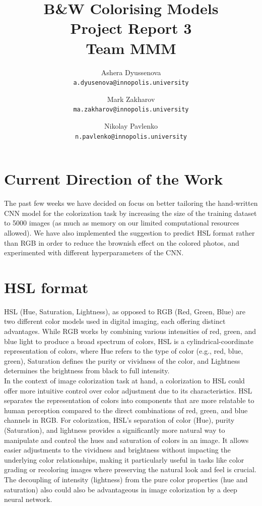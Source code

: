 \documentclass[]{article}
\title{B\&W Colorising Models\\Project Report 3\\Team MMM}
\author{
	Ashera Dyussenova\\
	\texttt{a.dyusenova@innopolis.university}
	\and
	Mark Zakharov\\
	\texttt{ma.zakharov@innopolis.university}
	\and
	Nikolay Pavlenko\\
	\texttt{n.pavlenko@innopolis.university}
}
\begin{document}
	\maketitle
	\section{Current Direction of the Work}
	The past few weeks we have decided on focus on better tailoring the hand-written CNN model for the colorization task by increasing the size of the training dataset to 5000 images (as much as memory on our limited computational resources allowed). We have also implemented the suggestion to predict HSL format rather than RGB in order to reduce the brownish effect on the colored photos, and experimented with different hyperparameters of the CNN.
	\\
	\section{HSL format}
	HSL (Hue, Saturation, Lightness), as opposed to RGB (Red, Green, Blue) are two different color models used in digital imaging, each offering distinct advantages. While RGB works by combining various intensities of red, green, and blue light to produce a broad spectrum of colors, HSL is a cylindrical-coordinate representation of colors, where Hue refers to the type of color (e.g., red, blue, green), Saturation defines the purity or vividness of the color, and Lightness determines the brightness from black to full intensity. \\
	
	In the context of image colorization task at hand, a colorization to HSL could offer more intuitive control over color adjustment due to its characteristics. HSL separates the representation of colors into components that are more relatable to human perception compared to the direct combinations of red, green, and blue channels in RGB. For colorization, HSL's separation of color (Hue), purity (Saturation), and lightness provides a significantly more natural way to manipulate and control the hues and saturation of colors in an image. It allows easier adjustments to the vividness and brightness without impacting the underlying color relationships, making it particularly useful in tasks like color grading or recoloring images where preserving the natural look and feel is crucial. The decoupling of intensity (lightness) from the pure color properties (hue and saturation) also could also be advantageous in image colorization by a deep neural network.
	\\
\end{document}
